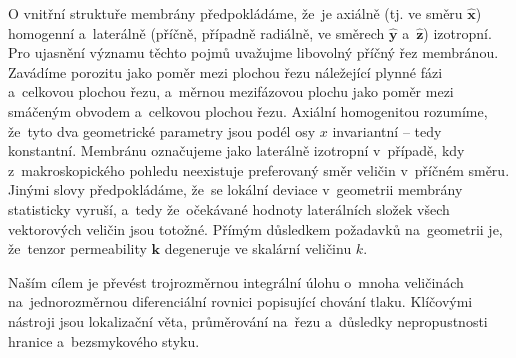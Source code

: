 O vnitřní struktuře membrány předpokládáme, že~je axiálně (tj. ve směru $\bm{\hat{x}}$) homogenní a~laterálně (příčně, případně radiálně, ve směrech $\bm{\hat{y}}$ a~$\bm{\hat{z}}$) izotropní. Pro ujasnění významu těchto pojmů uvažujme libovolný příčný řez membránou. Zavádíme porozitu \Unit{\varepsilon}{-} jako poměr mezi plochou řezu náležející plynné fázi a~celkovou plochou řezu, a~měrnou mezifázovou plochu   jako poměr mezi smáčeným obvodem  a~celkovou plochou řezu. Axiální homogenitou rozumíme, že~tyto dva geometrické parametry jsou podél osy $x$ invariantní -- tedy konstantní. Membránu označujeme jako laterálně izotropní v~případě, kdy z~makroskopického pohledu neexistuje preferovaný směr veličin v~příčném směru. Jinými slovy předpokládáme, že~se lokální deviace v~geometrii membrány statisticky vyruší, a~tedy že~očekávané hodnoty laterálních složek všech vektorových veličin jsou totožné. Přímým důsledkem požadavků na~geometrii je, že~tenzor permeability $\bm{k}$ degeneruje ve skalární veličinu $k$.

Naším cílem je převést trojrozměrnou integrální úlohu o~mnoha veličinách na~jednorozměrnou diferenciální rovnici popisující chování tlaku. Klíčovými nástroji jsou lokalizační věta, průměrování na~řezu a~důsledky nepropustnosti hranice a~bezsmykového styku. 

